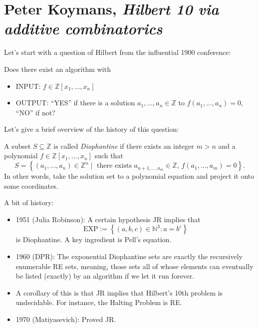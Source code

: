 \documentclass[reqno]{amsart} 
\begin{document}
\section{Peter Koymans, \emph{Hilbert 10 via additive combinatorics}}


Let's start with a question of Hilbert from the influential 1900 conference:
\begin{question}
  Does there exist an algorithm with
  \begin{itemize}
  \item INPUT: $f \in \mathbb{Z}[x_1, \dotsc, x_n]$
  \item OUTPUT: ``YES'' if there is a solution $a_1, \dotsc, a_n \in \mathbb{Z}$ to $f(a_1, \dotsc, a_n) = 0$, ``NO'' if not?
  \end{itemize}  
\end{question}
Let's give a brief overview of the history of this question:
\begin{definition}
  A subset $S \subseteq \mathbb{Z}$ is called \emph{Diophantine} if there exists an integer $m > n$ and a polynomial $f \in \mathbb{Z}[x_1, \dotsc, x_n]$ such that
  \begin{equation*}
    S = \left\{(a_1, \dotsc, a_n) \in \mathbb{Z}^n \mid \text{ there exists } a_{n + 1, \dotsc, a_m} \in \mathbb{Z}, \, f(a_1, \dotsc, a_m) = 0 \right\}.
  \end{equation*}
  In other words, take the solution set to a polynomial equation and project it onto some coordinates.
\end{definition}
A bit of history:
\begin{itemize}
\item 1951 (Julia Robinson): A certain hypothesis \textrm{JR} implies that
  \begin{equation*}
    \mathrm{EXP} := \left\{(a, b, c) \in \mathbb{N}^3 : a = b^{c} \right\}
  \end{equation*}
  is Diophantine.  A key ingredient is Pell's equation.
\item 1960 (DPR): The exponential Diophantine sets are exactly the recursively enumerable \textrm{RE} sets, meaning, those sets all of whose elements can eventually be listed (exactly) by an algorithm if we let it run forever.  
\item A corollary of this is that \textrm{JR} implies that Hilbert's 10th problem is undecidable.  For instance, the Halting Problem is \textrm{RE}.
\item 1970 (Matiyasevich): Proved \textrm{JR}.
\end{itemize}
\end{document}
